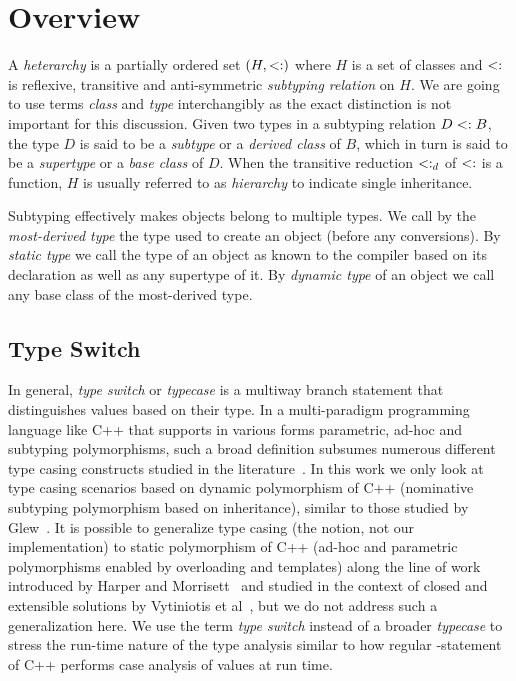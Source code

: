 \section{Overview} %
\label{sec:over}

A \emph{heterarchy} is a partially ordered set $(H,<:)$ where $H$ is a set 
of classes and $<:$ is reflexive, transitive and anti-symmetric 
\emph{subtyping relation} on $H$. We are going to use terms \emph{class} and \emph{type}  
interchangibly as the exact distinction is not important for this discussion. 
Given two types in a subtyping relation $D <: B$, the type $D$ is said to be a 
\emph{subtype} or a \emph{derived class} of $B$, which in turn is said to be a 
\emph{supertype} or a \emph{base class} of $D$. When the transitive reduction 
$<:_d$ of $<:$ is a function, $H$ is usually referred to as 
\emph{hierarchy} to indicate single inheritance.

Subtyping effectively makes objects belong to multiple types. We call by the 
\emph{most-derived type} the type used to create an object (before any 
conversions). By \emph{static type} we call the type of an object as known to 
the compiler based on its declaration as well as any supertype of it. By 
\emph{dynamic type} of an object we call any base class of the most-derived type.

\subsection{Type Switch}

In general, \emph{type switch} or \emph{typecase} is a multiway branch statement 
that distinguishes values based on their type. In a multi-paradigm programming 
language like C++ that supports in various forms parametric, ad-hoc and 
subtyping polymorphisms, such a broad definition subsumes numerous different type 
casing constructs studied in the literature~\cite{Intensional95,Glew99,OpenShutTypecase05}. 
In this work we only look at type casing scenarios based on dynamic polymorphism 
of C++ (nominative subtyping polymorphism based on inheritance), similar to 
those studied by Glew~\cite{Glew99}. It is possible to generalize type casing 
(the notion, not our implementation) to static polymorphism of C++ (ad-hoc and 
parametric polymorphisms enabled by overloading and templates) along the line of 
work introduced by Harper and Morrisett~\cite{Intensional95} and studied in the
context of closed and extensible solutions by Vytiniotis et 
al~\cite{OpenShutTypecase05}, but we do not address such a generalization here. 
We use the term \emph{type switch} instead of a broader \emph{typecase} to 
stress the run-time nature of the type analysis similar to how regular 
-statement of C++ performs case analysis of values at run time.

